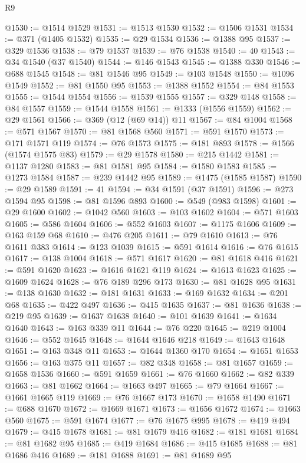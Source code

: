 \begin{lexlean}{R9}
\begin{coremodule}
@1530 := @1514 @1529
@1531 := @1513 @1530
@1532 := @1506 @1531
@1534 := @371 (@1405 @1532)
@1535 := @29 @1534
@1536 := @1388 @95
@1537 := @329 @1536
@1538 := @79 @1537
@1539 := @76 @1538
@1540 := 40
@1543 := @34 @1540 (@37 @1540)
@1544 := @146 @1543
@1545 := @1388 @330
@1546 := @688 @1545
@1548 := @81 @1546 @95
@1549 := @103 @1548
@1550 := @1096 @1549
@1552 := @81 @1550 @95
@1553 := @1388 @1552
@1554 := @84 @1553
@1555 := @1544 @1554
@1556 := @1539 @1555
@1557 := @329 @148
@1558 := @84 @1557
@1559 := @1544 @1558
@1561 := @1333 (@1556 @1559)
@1562 := @29 @1561
@1566 := @369 (@12 (@69 @14)) @11
@1567 := @84 @1004
@1568 := @571 @1567
@1570 := @81 @1568 @560
@1571 := @591 @1570
@1573 := @171 @1571 @119
@1574 := @76 @1573
@1575 := @181 @893
@1578 := @1566 (@1574 @1575 @83)
@1579 := @29 @1578
@1580 := @215 @1442
@1581 := @1137 @1280
@1583 := @81 @1581 @95
@1584 := @1580 @1583
@1585 := @1273 @1584
@1587 := @239 @1442 @95
@1589 := @1475 (@1585 @1587)
@1590 := @29 @1589
@1591 := 41
@1594 := @34 @1591 (@37 @1591)
@1596 := @273 @1594 @95
@1598 := @81 @1596 @893
@1600 := @549 (@983 @1598)
@1601 := @29 @1600
@1602 := @1042 @560
@1603 := @103 @1602
@1604 := @571 @1603
@1605 := @586 @1604
@1606 := @552 @1603
@1607 := @1175 @1606
@1609 := @163 @159 @68
@1610 := @476 @205
@1611 := @79 @1610
@1613 := @76 @1611 @383
@1614 := @123 @1039
@1615 := @591 @1614
@1616 := @76 @1615
@1617 := @138 @1004
@1618 := @571 @1617
@1620 := @81 @1618 @416
@1621 := @591 @1620
@1623 := @1616 @1621 @119
@1624 := @1613 @1623
@1625 := @1609 @1624
@1628 := @76 @189 @296 @173
@1630 := @81 @1628 @95
@1631 := @138 @1630
@1632 := @181 @1631
@1633 := @169 @1632
@1634 := @201 @68
@1635 := @422 @497
@1636 := @415 @1635
@1637 := @81 @1636
@1638 := @219 @95
@1639 := @1637 @1638
@1640 := @101 @1639
@1641 := @1634 @1640
@1643 := @163 @339 @11
@1644 := @76 @220
@1645 := @219 @1004
@1646 := @552 @1645
@1648 := @1644 @1646 @218
@1649 := @1643 @1648
@1651 := @163 @348 @11
@1653 := @1644 @1360 @170
@1654 := @1651 @1653
@1656 := @163 @375 @11
@1657 := @82 @348
@1658 := @81 @1657
@1659 := @1658 @1536
@1660 := @591 @1659
@1661 := @76 @1660
@1662 := @82 @339
@1663 := @81 @1662
@1664 := @1663 @497
@1665 := @79 @1664
@1667 := @1661 @1665 @119
@1669 := @76 @1667 @173
@1670 := @1658 @1490
@1671 := @688 @1670
@1672 := @1669 @1671
@1673 := @1656 @1672
@1674 := @1663 @560
@1675 := @591 @1674
@1677 := @76 @1675 @995
@1678 := @419 @494
@1679 := @415 @1678
@1681 := @81 @1679 @416
@1682 := @181 @1681
@1684 := @81 @1682 @95
@1685 := @419 @1684
@1686 := @415 @1685
@1688 := @81 @1686 @416
@1689 := @181 @1688
@1691 := @81 @1689 @95

\end{coremodule}
\end{lexlean}
